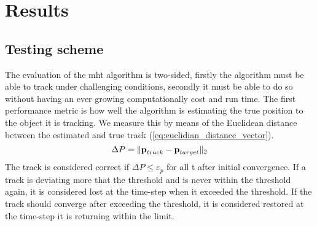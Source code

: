 \section{Results}
\label{sec:results}

\subsection{Testing scheme}
The evaluation of the \gls{mht} algorithm is two-sided, firstly the algorithm must be able to track under challenging conditions, secondly it must be able to do so without having an ever growing computationally cost and run time. The first performance metric is how well the algorithm is estimating the true position to the object it is tracking. We measure this by means of the Euclidean distance between the estimated and true track (\ref{eq:euclidian_distance_vector}).
\begin{equation}
	\Delta P = \| \boldsymbol{\mathbf{p}}_{track}-\boldsymbol{\mathbf{p}}_{target} \|_2
\label{eq:euclidian_distance_vector}
\end{equation}
The track is considered correct if $\Delta P \leq \varepsilon_p$ for all t after initial convergence. If a track is deviating more that the threshold and is never within the threshold again, it is considered lost at the time-step when it exceeded the threshold. If the track should converge after exceeding the threshold, it is considered restored at the time-step it is returning within the limit. 

